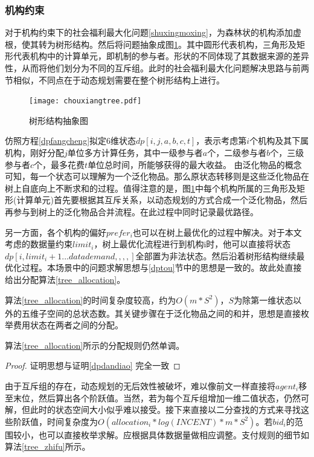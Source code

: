 \documentclass[promaster]{thesis-uestc}
\begin{document}
\FloatBarrier

\subsubsection{机构约束}
对于机构约束下的社会福利最大化问题\ref{shuxingmoxing}，为森林状的机构添加虚根，使其转为树形结构。然后将问题抽象成图\ref{chouxiangtree}。其中圆形代表机构，三角形及矩形代表机构中的计算单元，即机制的参与者。形状的不同体现了其数据来源的差异性，从而将他们划分为不同的互斥组。此时的社会福利最大化问题解决思路与前两节相似，不同点在于动态规划需要在整个树形结构上进行。

\begin{figure}[h]
    \texttt{[image: chouxiangtree.pdf]}
    \caption{树形结构抽象图}
    \label{chouxiangtree}
\end{figure}

仿照方程\ref{dpfangcheng}拟定6维状态$dp[i,j,a,b,c,t]$，表示考虑第$i$个机构及其下属机构，刚好分配$j$单位多方计算任务，其中一级参与者$a$个，二级参与者$b$个，三级参与者$c$个，最多花费$t$单位总时间，所能够获得的最大收益。
由泛化物品的概念可知，每一个状态可以理解为一个泛化物品。那么原状态转移则是这些泛化物品在树上自底向上不断求和的过程。值得注意的是，图\ref{chouxiangtree}中每个机构所属的三角形及矩形(计算单元)首先要根据其互斥关系，以动态规划的方式合成一个泛化物品，然后再参与到树上的泛化物品合并流程。在此过程中同时记录最优路径。

另一方面，各个机构的偏好$prefer_i$也可以在树上最优化的过程中解决。对于本文考虑的数据量约束$limit_i$，树上最优化流程进行到机构i时，他可以直接将状态$dp[i,limit_i+1...datademand,,,,]$全部置为非法状态。然后沿着树形结构继续最优化过程。本场景中的问题求解思想与\ref{dptou}节中的思想是一致的。故此处直接给出分配算法\ref{tree_allocation}。

算法\ref{tree_allocation}的时间复杂度较高，约为$O(m*S^2)$，$S$为除第一维状态以外的五维子空间的总状态数。其关键步骤在于泛化物品之间的和并，思想是直接枚举费用状态在两者之间的分配。

\begin{theorem}
 算法\ref{tree_allocation}所示的分配规则仍然单调。 
\end{theorem}

\begin{proof}
证明思想与证明\ref{dpdandiao} 完全一致
\end{proof}

由于互斥组的存在，动态规划的无后效性被破坏，难以像前文一样直接将$agent_i$移至末位，然后算出各个阶跃值。当然，若为每个互斥组增加一维二值状态，仍然可解，但此时的状态空间大小似乎难以接受。接下来直接以二分查找的方式来寻找这些阶跃值，时间复杂度为$O(allocation_i*log(INCENT)*m*S^2)$。若$bid_i$的范围较小，也可以直接枚举求解。应根据具体数据量做相应调整。支付规则的细节如算法\ref{tree_zhifu}所示。
\end{document}
